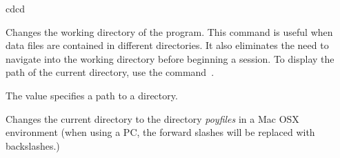 \begin{command}{cd}{cd}

	\syntax{\obligatory{(\poystring)}}

	\begin{poydescription}
            Changes the working directory of the program. This command is useful
            when data files are contained in different directories. It also
            eliminates the need to navigate into the working directory before
            beginning a \poy session. To display the path of the current
            directory, use the command~.
	\end{poydescription}

	\begin{arguments}
            {The value specifies a path to a directory.}
            {}
	\end{arguments}
	
	\begin{poyexamples}

            {Changes the current directory to the directory \emph{poyfiles} in a Mac OSX 
            environment (when using a PC, the forward slashes will be replaced with backslashes.)}
            

    \end{poyexamples}

    \begin{poyalso}
    \end{poyalso}

\end{command}

